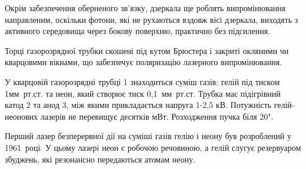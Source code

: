 \documentclass[twocolumn]{el-author}
\begin{document}
Окрім забезпечення оберненого зв'язку, дзеркала ще роблять
випромінювання направленим, оскільки фотони, які не рухаються вздовж вісі
дзеркала, виходять з активного середовища через бокову поверхню,
практично без підсилення.

Торці газорозрядної трубки скошені під кутом Брюстера і закриті
окляними чи кварцовими вікнами, що забезпечує поляризацію лазерного
випромінювання.

У кварцовій газорозрядні трубці 1 знаходиться суміш газів: гелій під
тиском 1мм~рт.ст. та неон, який створює тиск 0,1~мм~рт.ст. Трубка має
підігрівний катод 2 та анод 3, між якими прикладається напруга 1-2,5 кВ.
Потужність гелій-неонових лазерів не перевищує десятків мВт. Розходження
пучка біля 20".

Перший лазер безперервної дії на суміші газів гелію і неону був
розроблений у 1961~році. У цьому лазері неон є робочою речовиною, а гелій
слугує резервуаром збуджень, які резонансно передаються атомам неону.

\end{document}
